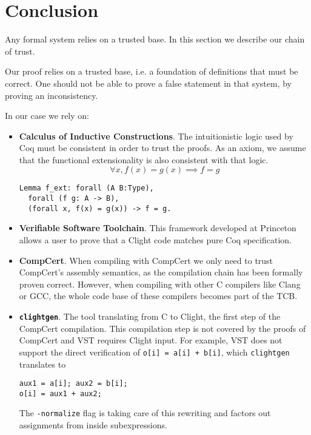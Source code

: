\section{Conclusion}
\label{sec:Conclusion}

Any formal system relies on a trusted base. In this section we describe our
chain of trust.

Our proof relies on a trusted base, i.e. a foundation of definitions that must be
correct. One should not be able to prove a false statement in that system, \eg by
proving an inconsistency.

In our case we rely on:
\begin{itemize}
      \item \textbf{Calculus of Inductive Constructions}. The intuitionistic logic
            used by Coq must be consistent in order to trust the proofs. As an axiom,
            we assume that the functional extensionality is also consistent with that logic.
            $$\forall x, f(x) = g(x) \implies f = g$$
            \begin{lstlisting}[language=Coq,belowskip=-0.25 \baselineskip]
Lemma f_ext: forall (A B:Type),
  forall (f g: A -> B),
  (forall x, f(x) = g(x)) -> f = g.
\end{lstlisting}

      \item \textbf{Verifiable Software Toolchain}. This framework developed at
            Princeton allows a user to prove that a Clight code matches pure Coq
            specification.

      \item \textbf{CompCert}. When compiling with CompCert we only need to trust
            CompCert's {assembly} semantics, as the compilation chain has been formally proven correct.
            However, when compiling with other C compilers like Clang or GCC, the
            whole code base of these compilers becomes part of the TCB.

      \item \textbf{\texttt{clightgen}}. The tool translating from {C} to
                  {Clight}, the first step of the CompCert compilation.
            This compilation step is not covered by the proofs of CompCert
            and VST requires Clight input. For example, VST does not support the direct verification of
            \texttt{o[i] = a[i] + b[i]}, which \texttt{clightgen} translates to
            \begin{lstlisting}[language=Ctweetnacl,stepnumber=0,belowskip=-0.5 \baselineskip]
aux1 = a[i]; aux2 = b[i];
o[i] = aux1 + aux2;
\end{lstlisting}
            The \texttt{-normalize} flag is taking care of this
            rewriting and factors out assignments from inside subexpressions.


\end{itemize}

